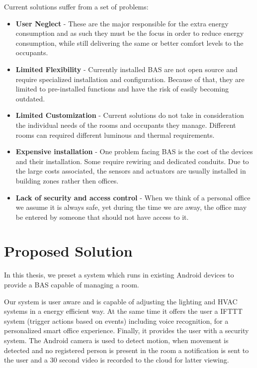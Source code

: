 Current solutions suffer from a set of problems:
\begin{itemize}
\item \textbf{User Neglect} - These are the major responsible for the extra energy consumption and as such they must be the focus in order to reduce energy consumption, while still delivering the same or better comfort levels to the occupants.
\item \textbf{Limited Flexibility} - Currently installed BAS are not open source and require specialized installation and configuration. Because of that, they are limited to pre-installed functions and have the risk of easily becoming outdated.
\item \textbf{Limited Customization} - Current solutions do not take in consideration the individual needs of the rooms and occupants they manage. Different rooms can required different luminous and thermal requirements. 
\item \textbf{Expensive installation} - One problem facing BAS is the cost of the devices and their installation. Some require rewiring  and dedicated conduits. Due to the large costs associated, the sensors and actuators are usually installed in building zones rather then offices.
\item \textbf{Lack of security and access control} - When we think of a personal office we assume it is always safe, yet during the time we are away, the office may be entered by someone that should not have access to it.  
\end{itemize}



\section{Proposed Solution}
\label{section:proposed}


In this thesis, we preset a system which runs in existing Android devices to provide a \ac{BAS} capable of managing a room. 

Our system is user aware and is capable of adjusting the lighting and \ac{HVAC} systems in a energy efficient way. At the same time it offers the user a \ac{IFTTT} system (trigger actions based on events) including voice recognition, for a personalized smart office experience. Finally, it provides the user with a security system. The Android camera is used to detect motion, when movement is detected and no registered person is present in the room a notification is sent to the user and a 30 second video is recorded to the cloud for latter viewing.


